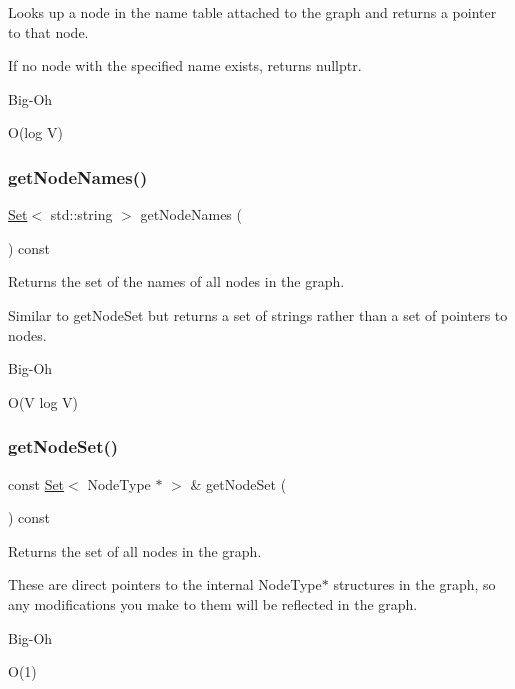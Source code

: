 Looks up a node in the name table attached to the graph and returns a pointer to that node. 

If no node with the specified name exists, returns {\ttfamily nullptr}. \begin{DoxyRefDesc}{Big-\/\+Oh}
\item[\mbox{\hyperlink{BigOh__BigOh000075}{Big-\/\+Oh}}]O(log V) \end{DoxyRefDesc}
\mbox{\label{classGraph_a3c6f37932f377dd2bf4fec61343a916d}} 
\subsubsection{\texorpdfstring{get\+Node\+Names()}{getNodeNames()}}
{\footnotesize\ttfamily \mbox{\hyperlink{classSet}{Set}}$<$ std\+::string $>$ get\+Node\+Names (\begin{DoxyParamCaption}{ }\end{DoxyParamCaption}) const}



Returns the set of the names of all nodes in the graph. 

Similar to get\+Node\+Set but returns a set of strings rather than a set of pointers to nodes. \begin{DoxyRefDesc}{Big-\/\+Oh}
\item[\mbox{\hyperlink{BigOh__BigOh000076}{Big-\/\+Oh}}]O(\+V log V) \end{DoxyRefDesc}
\mbox{\label{classGraph_abd5552888f57aaa581099e8146c617c9}} 
\subsubsection{\texorpdfstring{get\+Node\+Set()}{getNodeSet()}}
{\footnotesize\ttfamily const \mbox{\hyperlink{classSet}{Set}}$<$ Node\+Type $\ast$ $>$ \& get\+Node\+Set (\begin{DoxyParamCaption}{ }\end{DoxyParamCaption}) const}



Returns the set of all nodes in the graph. 

These are direct pointers to the internal Node\+Type$\ast$ structures in the graph, so any modifications you make to them will be reflected in the graph. \begin{DoxyRefDesc}{Big-\/\+Oh}
\item[\mbox{\hyperlink{BigOh__BigOh000077}{Big-\/\+Oh}}]O(1) \end{DoxyRefDesc}
\mbox{\label{classGraph_a54164ab847f3a5c7fe15d15ac95af443}} 
